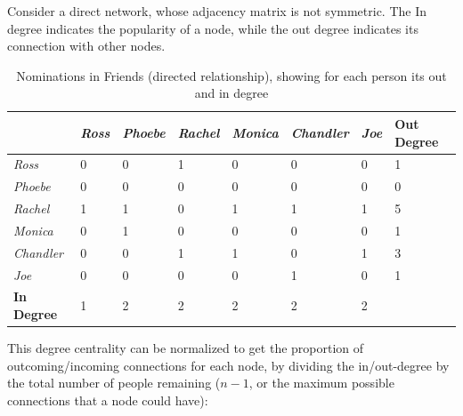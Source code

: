 \documentclass[
  notitlepage,
  onecolumn,
  openany]{book}
\begin{document}
Consider a direct network, whose adjacency matrix is not symmetric. The In degree indicates the popularity of a node, while the out degree indicates its connection with other nodes.

\begin{table}[h]
\centering
\begin{tabular}{@{}llllllll@{}}
\toprule
                   & \textit{Ross} & \textit{Phoebe} & \textit{Rachel} & \textit{Monica} & \textit{Chandler} & \textit{Joe} & \textbf{Out Degree} \\ \midrule
\textit{Ross}      & 0             & 0               & 1               & 0               & 0                 & 0            & 1                   \\
\textit{Phoebe}    & 0             & 0               & 0               & 0               & 0                 & 0            & 0                   \\
\textit{Rachel}    & 1             & 1               & 0               & 1               & 1                 & 1            & 5                   \\
\textit{Monica}    & 0             & 1               & 0               & 0               & 0                 & 0            & 1                   \\
\textit{Chandler}  & 0             & 0               & 1               & 1               & 0                 & 1            & 3                   \\
\textit{Joe}       & 0             & 0               & 0               & 0               & 1                 & 0            & 1                   \\
\textbf{In Degree} & 1             & 2               & 2               & 2               & 2                 & 2            &                     \\ \bottomrule
\end{tabular}
\caption{Nominations in Friends (directed relationship), showing for each person its out and in degree}
\label{tab:dir_degree}
\end{table}

This degree centrality can be normalized to get the proportion of outcoming/incoming connections for each node, by dividing the in/out-degree by the total number of people remaining (\(n-1\), or the maximum possible connections that a node could have):
\end{document}
